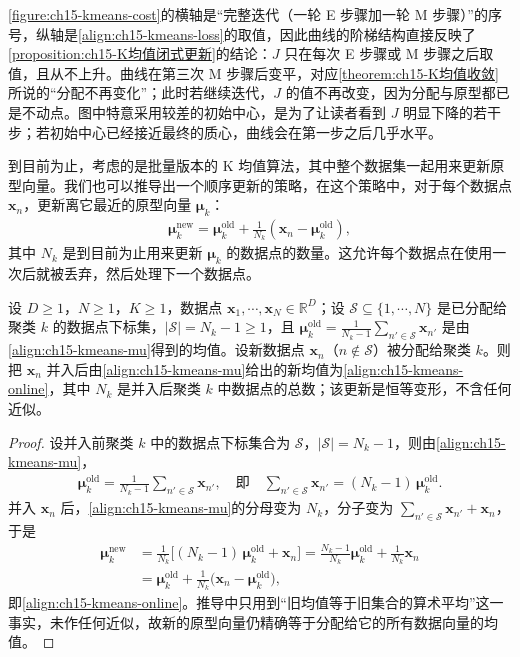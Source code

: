 \documentclass[../../main.tex]{subfiles}
\begin{document}
\begin{remark}
\cref{figure:ch15-kmeans-cost}的横轴是“完整迭代（一轮 E 步骤加一轮 M 步骤）”的序号，纵轴是\eqref{align:ch15-kmeans-loss}的取值，因此曲线的阶梯结构直接反映了\cref{proposition:ch15-K均值闭式更新}的结论：$J$ 只在每次 E 步骤或 M 步骤之后取值，且从不上升。曲线在第三次 M 步骤后变平，对应\cref{theorem:ch15-K均值收敛}所说的“分配不再变化”；此时若继续迭代，$J$ 的值不再改变，因为分配与原型都已是不动点。图中特意采用较差的初始中心，是为了让读者看到 $J$ 明显下降的若干步；若初始中心已经接近最终的质心，曲线会在第一步之后几乎水平。
\end{remark}

到目前为止，考虑的是批量版本的 K 均值算法，其中整个数据集一起用来更新原型向量。我们也可以推导出一个顺序更新的策略，在这个策略中，对于每个数据点 $\bm{x}_n$，更新离它最近的原型向量 $\bm{\mu}_k$：
\begin{align}
\bm{\mu}_k^{\text{new}}=\bm{\mu}_k^{\text{old}}+\frac{1}{N_k}(\bm{x}_n-\bm{\mu}_k^{\text{old}}),
\label{align:ch15-kmeans-online}
\end{align}
其中 $N_k$ 是到目前为止用来更新 $\bm{\mu}_k$ 的数据点的数量。这允许每个数据点在使用一次后就被丢弃，然后处理下一个数据点。

\begin{proposition}[顺序 K 均值更新]\label{proposition:ch15-顺序K均值}
设 $D\geqslant1$，$N\geqslant1$，$K\geqslant1$，数据点 $\bm{x}_1,\cdots,\bm{x}_N\in\mathbb{R}^{D}$；设 $\mathcal{S}\subseteq\{1,\cdots,N\}$ 是已分配给聚类 $k$ 的数据点下标集，$|\mathcal{S}|=N_k-1\geqslant1$，且 $\bm{\mu}_k^{\text{old}}=\frac{1}{N_k-1}\sum_{n'\in\mathcal{S}}\bm{x}_{n'}$ 是由\eqref{align:ch15-kmeans-mu}得到的均值。设新数据点 $\bm{x}_n$（$n\notin\mathcal{S}$）被分配给聚类 $k$。则把 $\bm{x}_n$ 并入后由\eqref{align:ch15-kmeans-mu}给出的新均值为\eqref{align:ch15-kmeans-online}，其中 $N_k$ 是并入后聚类 $k$ 中数据点的总数；该更新是恒等变形，不含任何近似。
\end{proposition}
\begin{proof}
设并入前聚类 $k$ 中的数据点下标集合为 $\mathcal{S}$，$|\mathcal{S}|=N_k-1$，则由\eqref{align:ch15-kmeans-mu}，
\begin{align*}
\bm{\mu}_k^{\text{old}}=\frac{1}{N_k-1}\sum_{n'\in\mathcal{S}}\bm{x}_{n'},
\quad\text{即}\quad
\sum_{n'\in\mathcal{S}}\bm{x}_{n'}=(N_k-1)\,\bm{\mu}_k^{\text{old}}.
\end{align*}
并入 $\bm{x}_n$ 后，\eqref{align:ch15-kmeans-mu}的分母变为 $N_k$，分子变为 $\sum_{n'\in\mathcal{S}}\bm{x}_{n'}+\bm{x}_n$，于是
\begin{align*}
\bm{\mu}_k^{\text{new}}
&=\frac{1}{N_k}\Big[(N_k-1)\,\bm{\mu}_k^{\text{old}}+\bm{x}_n\Big]
=\frac{N_k-1}{N_k}\bm{\mu}_k^{\text{old}}+\frac{1}{N_k}\bm{x}_n\\
&=\bm{\mu}_k^{\text{old}}+\frac{1}{N_k}\big(\bm{x}_n-\bm{\mu}_k^{\text{old}}\big),
\end{align*}
即\eqref{align:ch15-kmeans-online}。推导中只用到“旧均值等于旧集合的算术平均”这一事实，未作任何近似，故新的原型向量仍精确等于分配给它的所有数据向量的均值。
\end{proof}
\end{document}

